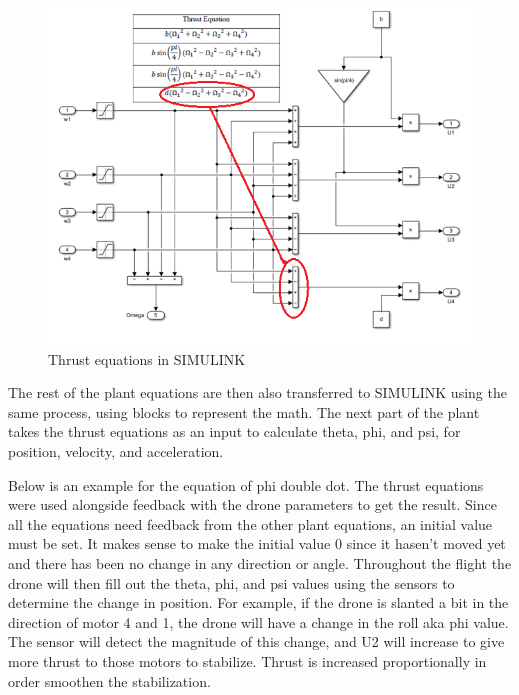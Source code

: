 \begin{figure}[H]
\begin{center}
   \includegraphics[scale =1]{pictures/control/thrust equation in simulink.png}
\end{center}
\caption{Thrust equations in SIMULINK}
\end{figure}

The rest of the plant equations are then also transferred to SIMULINK using the same process, using blocks to represent the math. The next part of the plant takes the thrust equations as an input to calculate theta, phi, and psi, for position, velocity, and acceleration.

Below is an example for the equation of phi double dot. The thrust equations were used alongside feedback with the drone parameters to get the result. Since all the equations need feedback from the other plant equations, an initial value must be set. It makes sense to make the initial value 0 since it hasen't moved yet and there has been no change in any direction or angle. Throughout the flight the drone will then fill out the theta, phi, and psi values using the sensors to determine the change in position. For example, if the drone is slanted a bit in the direction of motor 4 and 1, the drone will have a change in the roll aka phi value. The sensor will detect the magnitude of this change, and U2 will increase to give more thrust to those motors to stabilize. Thrust is increased proportionally in order smoothen the stabilization. 

